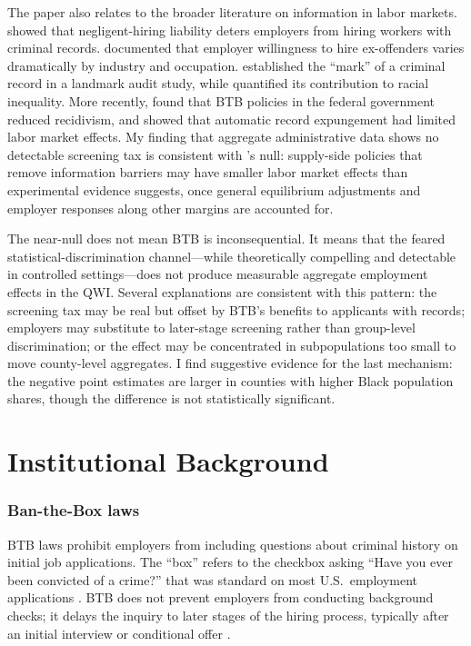 \documentclass[12pt]{article}
\begin{document}
The paper also relates to the broader literature on information in labor markets. \citet{autor2006} showed that negligent-hiring liability deters employers from hiring workers with criminal records. \citet{holzer2006} documented that employer willingness to hire ex-offenders varies dramatically by industry and occupation. \citet{pager2003} established the ``mark'' of a criminal record in a landmark audit study, while \citet{western2006} quantified its contribution to racial inequality. More recently, \citet{craigie2020} found that BTB policies in the federal government reduced recidivism, and \citet{jackson2023} showed that automatic record expungement had limited labor market effects. My finding that aggregate administrative data shows no detectable screening tax is consistent with \citeauthor{jackson2023}'s null: supply-side policies that remove information barriers may have smaller labor market effects than experimental evidence suggests, once general equilibrium adjustments and employer responses along other margins are accounted for.

The near-null does not mean BTB is inconsequential. It means that the feared statistical-discrimination channel---while theoretically compelling and detectable in controlled settings---does not produce measurable aggregate employment effects in the QWI. Several explanations are consistent with this pattern: the screening tax may be real but offset by BTB's benefits to applicants with records; employers may substitute to later-stage screening rather than group-level discrimination; or the effect may be concentrated in subpopulations too small to move county-level aggregates. I find suggestive evidence for the last mechanism: the negative point estimates are larger in counties with higher Black population shares, though the difference is not statistically significant.


\section{Institutional Background}

\subsubsection*{Ban-the-Box laws} BTB laws prohibit employers from including questions about criminal history on initial job applications. The ``box'' refers to the checkbox asking ``Have you ever been convicted of a crime?'' that was standard on most U.S.\ employment applications \citep{rodriguez2011}. BTB does not prevent employers from conducting background checks; it delays the inquiry to later stages of the hiring process, typically after an initial interview or conditional offer \citep{avery2019}.
\end{document}
